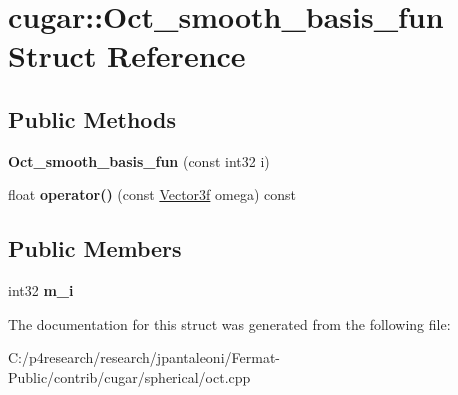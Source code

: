 \hypertarget{structcugar_1_1_oct__smooth__basis__fun}{}\section{cugar\+:\+:Oct\+\_\+smooth\+\_\+basis\+\_\+fun Struct Reference}
\label{structcugar_1_1_oct__smooth__basis__fun}
\subsection*{Public Methods}
\begin{DoxyCompactItemize}
\item 
\mbox{\label{structcugar_1_1_oct__smooth__basis__fun_a43f88db0ed07c815926b707a89c90b25}} 
{\bfseries Oct\+\_\+smooth\+\_\+basis\+\_\+fun} (const int32 i)
\item 
\mbox{\label{structcugar_1_1_oct__smooth__basis__fun_a820a250e813bd8823b30efcfaa907ba4}} 
float {\bfseries operator()} (const \hyperlink{structcugar_1_1_vector}{Vector3f} omega) const
\end{DoxyCompactItemize}
\subsection*{Public Members}
\begin{DoxyCompactItemize}
\item 
\mbox{\label{structcugar_1_1_oct__smooth__basis__fun_ab305e345db17788f5c7db3d7f5fdfc29}} 
int32 {\bfseries m\+\_\+i}
\end{DoxyCompactItemize}


The documentation for this struct was generated from the following file\+:\begin{DoxyCompactItemize}
\item 
C\+:/p4research/research/jpantaleoni/\+Fermat-\/\+Public/contrib/cugar/spherical/oct.\+cpp\end{DoxyCompactItemize}
